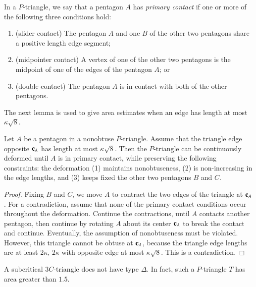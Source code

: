 \begin{definition}
In a $P$-triangle, we say that a pentagon $A$ has {\it primary
  contact} if one or more of the following three conditions hold:
\begin{enumerate}
\item (slider contact) The pentagon $A$ and one $B$ of the other two pentagons
share a positive length edge segment;
\item (midpointer contact)  A vertex of one of the other two pentagons
is  the midpoint of one of the edges of the pentagon $A$; or
\item (double contact) The pentagon $A$ is in contact
with both of the other pentagons.
\end{enumerate}
\end{definition}

The next lemma is used to give area
estimates when an edge has length at most $\kappa\sqrt{8}$.

\begin{lemma} 
  Let $A$ be a pentagon in a nonobtuse $P$-triangle.  Assume that the
  triangle edge opposite ${\mathbf c}_A$ has length at most $\kappa\sqrt{8}$.
  Then the $P$-triangle can be continuously deformed until $A$ is in
  primary contact, while preserving the following constraints: the
  deformation (1) maintains nonobtuseness, (2) is non-increasing in
  the edge lengths, and (3) keeps fixed the other two pentagons $B$
  and $C$.
\end{lemma}

\begin{proof} Fixing $B$ and $C$, we move $A$ to contract the two
  edges of the triangle at ${\mathbf c}_A$.  For a contradiction, assume that
  none of the primary contact conditions occur throughout the
  deformation.  Continue the contractions, until $A$ contacts another
  pentagon, then continue by rotating $A$ about its center ${\mathbf c}_A$ to
  break the contact and continue.  Eventually, the assumption of
  nonobtuseness must be violated.  However, this triangle cannot be
  obtuse at ${\mathbf c}_A$, because the triangle edge lengths are at least $2
  \kappa$, $2 \kappa$ with opposite edge at most
  $\kappa\sqrt{8}$. This is a contradiction.
\end{proof}

\begin{lemma} A subcritical $3C$-triangle does not have type $\Delta$.
  In fact, such a $P$-triangle $T$ has area greater than $1.5$.
\end{lemma}

